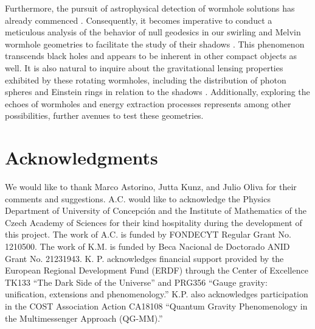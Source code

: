 \documentclass[aps,preprint,groupedaddress,nofootinbib,superscriptaddress,showkeys,showpacs,eqsecnum,amsmath,amssymb]{revtex4-1}
\begin{document}
Furthermore, the pursuit of astrophysical detection of wormhole solutions has already commenced \cite{Abe:2010ap,Toki:2011zu,Takahashi:2013jqa}. Consequently, it becomes imperative to conduct a meticulous analysis of the behavior of null geodesics in our swirling and Melvin wormhole geometries to facilitate the study of their shadows \cite{Gyulchev:2018fmd,Shaikh:2018kfv,Perlick:2021aok}. This phenomenon transcends black holes and appears to be inherent in other compact objects as well. It is also natural to inquire about the gravitational lensing properties exhibited by these rotating wormholes, including the distribution of photon spheres and Einstein rings in relation to the shadows \cite{Cramer:1994qj,Safonova:2001vz,Perlick:2003vg,Nandi:2006ds,Kuhfittig:2013hva,Tsukamoto:2016zdu,Shaikh:2018oul,Jusufi:2017mav,Huang:2023yqd}. Additionally, exploring the echoes of wormholes \cite{Mark:2017dnq,Bueno:2017hyj,Liu:2020qia,Vlachos:2021weq,Yang:2022ryf} and energy extraction processes \cite{Patel:2022jbk,Ye:2023xyv}  represents among other possibilities, further avenues to test these geometries.


















\section{Acknowledgments} 

We would like to thank Marco Astorino, Jutta Kunz, and Julio Oliva for their comments and suggestions. A.C. would like to acknowledge the Physics Department of University of Concepci\'on and the Institute of Mathematics of the Czech Academy of Sciences for their kind hospitality during the development of this project. The work of A.C. is funded by FONDECYT Regular Grant No. 1210500. The work of K.M. is funded by Beca Nacional de Doctorado ANID Grant No. 21231943.
K. P. acknowledges financial support
provided by the European Regional Development Fund (ERDF) through the Center of Excellence TK133 “The
Dark Side of the Universe” and PRG356 “Gauge gravity: unification, extensions and phenomenology.” K.P. also
acknowledges participation in the COST Association Action CA18108 “Quantum Gravity Phenomenology in the
Multimessenger Approach (QG-MM).”
\end{document}
